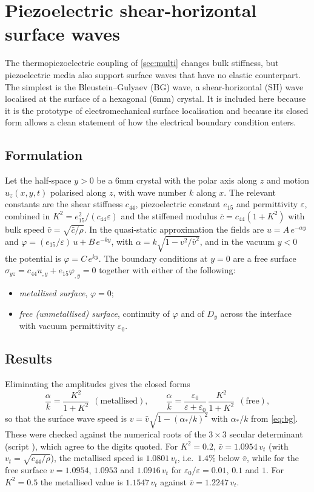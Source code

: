 \section{Piezoelectric shear-horizontal surface waves}\label{sec:bg}

The thermopiezoelectric coupling of \cref{sec:multi} changes bulk stiffness, but piezoelectric media also support surface waves that have no elastic counterpart. The simplest is the Bleustein--Gulyaev (BG) wave, a shear-horizontal (SH) wave localised at the surface of a hexagonal (6mm) crystal. It is included here because it is the prototype of electromechanical surface localisation and because its closed form allows a clean statement of how the electrical boundary condition enters.

\subsection{Formulation}
Let the half-space $y>0$ be a 6mm crystal with the polar axis along $z$ and motion $u_z(x,y,t)$ polarised along $z$, with wave number $k$ along $x$. The relevant constants are the shear stiffness $c_{44}$, piezoelectric constant $e_{15}$ and permittivity $\varepsilon$, combined in $K^2=e_{15}^2/(c_{44}\varepsilon)$ and the stiffened modulus $\bar c=c_{44}(1+K^2)$ with bulk speed $\bar v=\sqrt{\bar c/\rho}$. In the quasi-static approximation the fields are $u=A\,e^{-\alpha y}$ and $\varphi=(e_{15}/\varepsilon)\,u+B\,e^{-ky}$, with $\alpha=k\sqrt{1-v^2/\bar v^2}$, and in the vacuum $y<0$ the potential is $\varphi=C\,e^{ky}$. The boundary conditions at $y=0$ are a free surface $\sigma_{yz}=c_{44}u_{,y}+e_{15}\varphi_{,y}=0$ together with either of the following:
\begin{itemize}
\item \emph{metallised surface}, $\varphi=0$;
\item \emph{free (unmetallised) surface}, continuity of $\varphi$ and of $D_y$ across the interface with vacuum permittivity $\varepsilon_0$.
\end{itemize}

\subsection{Results}
Eliminating the amplitudes gives the closed forms
\begin{equation}\label{eq:bg}
\frac{\alpha}{k}=\frac{K^2}{1+K^2}\ \ (\text{metallised}),\qquad
\frac{\alpha}{k}=\frac{\varepsilon_0}{\varepsilon+\varepsilon_0}\,\frac{K^2}{1+K^2}\ \ (\text{free}),
\end{equation}
so that the surface wave speed is $v=\bar v\sqrt{1-(\alpha_\ast/k)^2}$ with $\alpha_\ast/k$ from \cref{eq:bg}. These were checked against the numerical roots of the $3\times3$ secular determinant (script ), which agree to the digits quoted. For $K^2=0.2$, $\bar v=1.0954\,v_t$ (with $v_t=\sqrt{c_{44}/\rho}$), the metallised speed is $1.0801\,v_t$, i.e.\ $1.4\%$ below $\bar v$, while for the free surface $v=1.0954$, $1.0953$ and $1.0916\,v_t$ for $\varepsilon_0/\varepsilon=0.01,\,0.1$ and $1$. For $K^2=0.5$ the metallised value is $1.1547\,v_t$ against $\bar v=1.2247\,v_t$.

